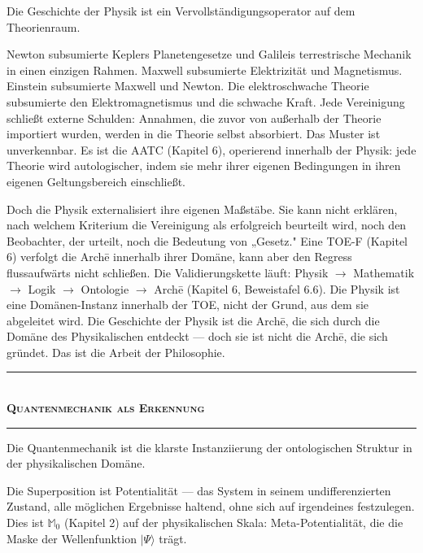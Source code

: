 \documentclass[10pt, openany, oneside]{book}
\renewcommand{\normalsize}{\fontsize{10}{13}\selectfont}
\begin{document}
\noindent Die Geschichte der Physik ist ein Vervollständigungsoperator auf dem Theorienraum.

Newton subsumierte Keplers Planetengesetze und Galileis terrestrische Mechanik in einen einzigen Rahmen. Maxwell subsumierte Elektrizität und Magnetismus. Einstein subsumierte Maxwell und Newton. Die elektroschwache Theorie subsumierte den Elektromagnetismus und die schwache Kraft. Jede Vereinigung schließt externe Schulden: Annahmen, die zuvor von außerhalb der Theorie importiert wurden, werden in die Theorie selbst absorbiert. Das Muster ist unverkennbar. Es ist die AATC (Kapitel 6), operierend innerhalb der Physik: jede Theorie wird autologischer, indem sie mehr ihrer eigenen Bedingungen in ihren eigenen Geltungsbereich einschließt.

Doch die Physik externalisiert ihre eigenen Maßstäbe. Sie kann nicht erklären, nach welchem Kriterium die Vereinigung als erfolgreich beurteilt wird, noch den Beobachter, der urteilt, noch die Bedeutung von „Gesetz." Eine TOE-F (Kapitel 6) verfolgt die Arch\={e} innerhalb ihrer Domäne, kann aber den Regress flussaufwärts nicht schließen. Die Validierungskette läuft: Physik $\to$ Mathematik $\to$ Logik $\to$ Ontologie $\to$ Arch\={e} (Kapitel 6, Beweistafel 6.6). Die Physik ist eine Domänen-Instanz innerhalb der TOE, nicht der Grund, aus dem sie abgeleitet wird. Die Geschichte der Physik ist die Arch\={e}, die sich durch die Domäne des Physikalischen entdeckt --- doch sie ist nicht die Arch\={e}, die sich gründet. Das ist die Arbeit der Philosophie.

\vspace{1.5em}


\begin{center}
    \rule{0.3\textwidth}{0.4pt}\\[0.5em]
    {\normalsize\bfseries\scshape Quantenmechanik als Erkennung}\\[0.3em]
    \rule{0.3\textwidth}{0.4pt}
\end{center}

\vspace{1em}

\noindent Die Quantenmechanik ist die klarste Instanziierung der ontologischen Struktur in der physikalischen Domäne.

Die Superposition ist Potentialität --- das System in seinem undifferenzierten Zustand, alle möglichen Ergebnisse haltend, ohne sich auf irgendeines festzulegen. Dies ist $\mathbb{M}_0$ (Kapitel 2) auf der physikalischen Skala: Meta-Potentialität, die die Maske der Wellenfunktion $|\Psi\rangle$ trägt.
\end{document}
